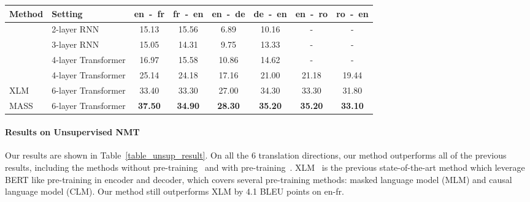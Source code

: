 \documentclass{article}
\begin{document}
	\begin{table*}[h]
		\small
		\centering
		\begin{tabular}{l|l|c c |  c c | c c}
			\toprule
Method & Setting & en~-~fr & fr~-~en & en~-~de & de~-~en &en~-~ro & ro~-~en \\
			\midrule
			\citet{artetxe2017unsupervised} & 2-layer RNN & 15.13 & 15.56 & 6.89 & 10.16 & - & - \\
			\citet{lample2017unsupervised}  & 3-layer RNN & 15.05 & 14.31 & 9.75  & 13.33 & - & - \\
			\citet{yang2018unsupervised}    & 4-layer Transformer & 16.97 & 15.58 & 10.86 & 14.62 & - & - \\
			
			\citet{DBLP:conf/emnlp/LampleOCDR18} & 4-layer Transformer & 25.14 & 24.18 & 17.16 & 21.00 & 21.18 & 19.44 \\
			
			XLM~\citep{Lample2019MLM}  			& 6-layer Transformer & 33.40 & 33.30 & 27.00 & 34.30 & 33.30 & 31.80 \\
			\midrule
			
			MASS & 6-layer Transformer & \textbf{37.50} & \textbf{34.90} & \textbf{28.30} & \textbf{35.20} & \textbf{35.20} & \textbf{33.10} \\
			\bottomrule
			
		\end{tabular}
		\vspace{-0.2cm}
		\caption{The BLEU score comparisons between MASS and the previous works on unsupervised NMT. Results on en-fr and fr-en pairs are reported on \emph{newstest2014} and the others are on \emph{newstest2016}. Since XLM uses different combinations of MLM and CLM in the encoder and decoder, we report the highest BLEU score for XLM on each language pair. }
		\label{table_unsup_result}
	\end{table*}
	
	\paragraph{Results on Unsupervised NMT} Our results are shown in Table~\ref{table_unsup_result}. On all the 6 translation directions, our method outperforms all of the previous results, including the methods without pre-training~\citep{DBLP:conf/emnlp/LampleOCDR18} and with pre-training~\citep{Lample2019MLM}. XLM~\citep{Lample2019MLM} is the previous state-of-the-art method which leverage BERT like pre-training in encoder and decoder, which covers several pre-training methods: masked language model (MLM) and causal language model (CLM). Our method still outperforms XLM by 4.1 BLEU points on en-fr.
	
\end{document}
